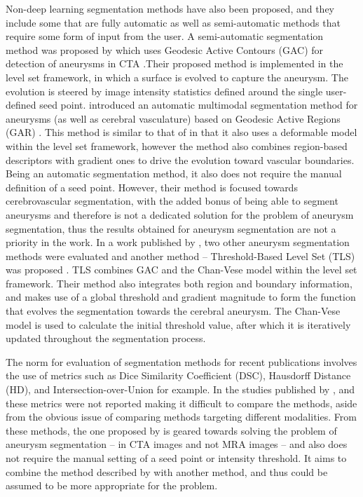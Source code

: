 Non-deep learning segmentation methods have also been proposed, and they include some that are fully automatic as well as semi-automatic methods that require some form of input from the user. A semi-automatic segmentation method was proposed by \citeauthor{Firouzian2011} which uses Geodesic Active Contours (GAC) for detection of aneurysms in CTA \cite{Firouzian2011}.Their proposed method is implemented in the level set framework, in which a surface is evolved to capture the aneurysm. The evolution is steered by image intensity statistics defined around the single user-defined seed point. \citeauthor{Bogunovic2011} introduced an automatic multimodal segmentation method for aneurysms (as well as cerebral vasculature) based on Geodesic Active Regions (GAR) \cite{Bogunovic2011}. This method is similar to that of \citeauthor{Firouzian2011} in that it also uses a deformable model within the level set framework, however the method also combines region-based descriptors with gradient ones to drive the evolution toward vascular boundaries. Being an automatic segmentation method, it also does not require the manual definition of a seed point. However, their method is focused towards cerebrovascular segmentation, with the added bonus of being able to segment aneurysms and therefore is not a dedicated solution for the problem of aneurysm segmentation, thus the results obtained for aneurysm segmentation are not a priority in the work. In a work published by \citeauthor{Sen2013}, two other aneurysm segmentation methods were evaluated and another method -- Threshold-Based Level Set (TLS) was proposed \cite{Sen2013}. TLS combines GAC and the Chan-Vese model \cite{Chan2001} within the level set framework. Their method also integrates both region and boundary information, and makes use of a global threshold and gradient magnitude to form the function that evolves the segmentation towards the cerebral aneurysm. The Chan-Vese model is used to calculate the initial threshold value, after which it is iteratively updated throughout the segmentation process. 

The norm for evaluation of segmentation methods for recent publications involves the use of metrics such as Dice Similarity Coefficient (DSC), Hausdorff Distance (HD), and Intersection-over-Union for example. In the studies published by \citeauthor{Firouzian2011}, \citeauthor{Bogunovic2011} and \citeauthor{Sen2013} these metrics were not reported making it difficult to compare the methods, aside from the obvious issue of comparing methods targeting different modalities. From these methods, the one proposed by \citeauthor{Sen2013} is geared towards solving the problem of aneurysm segmentation -- in CTA images and not MRA images -- and also does not require the manual setting of a seed point or intensity threshold. It aims to combine the method described by \citeauthor{Firouzian2011} with another method, and thus could be assumed to be more appropriate for the problem. 

